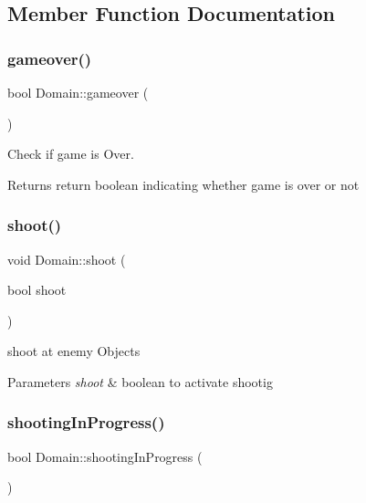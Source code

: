 \subsection{Member Function Documentation}
\mbox{\label{class_domain_acdd42563f2efe7a6c91e7c968f1e2f8b}} 
\subsubsection{\texorpdfstring{gameover()}{gameover()}}
{\footnotesize\ttfamily bool Domain\+::gameover (\begin{DoxyParamCaption}{ }\end{DoxyParamCaption})\hspace{0.3cm}{\ttfamily [inline]}}



Check if game is Over. 

\begin{DoxyReturn}{Returns}
return boolean indicating whether game is over or not 
\end{DoxyReturn}
\mbox{\label{class_domain_abac8643664087595ce3f46eb038e973f}} 
\subsubsection{\texorpdfstring{shoot()}{shoot()}}
{\footnotesize\ttfamily void Domain\+::shoot (\begin{DoxyParamCaption}\item[{bool}]{shoot }\end{DoxyParamCaption})}



shoot at enemy Objects 


\begin{DoxyParams}{Parameters}
{\em shoot} & boolean to activate shootig \\
\hline
\end{DoxyParams}
\mbox{\label{class_domain_a2c965d6ecca1739641f4959e183fe80c}} 
\subsubsection{\texorpdfstring{shooting\+In\+Progress()}{shootingInProgress()}}
{\footnotesize\ttfamily bool Domain\+::shooting\+In\+Progress (\begin{DoxyParamCaption}{ }\end{DoxyParamCaption})\hspace{0.3cm}{\ttfamily [inline]}}



